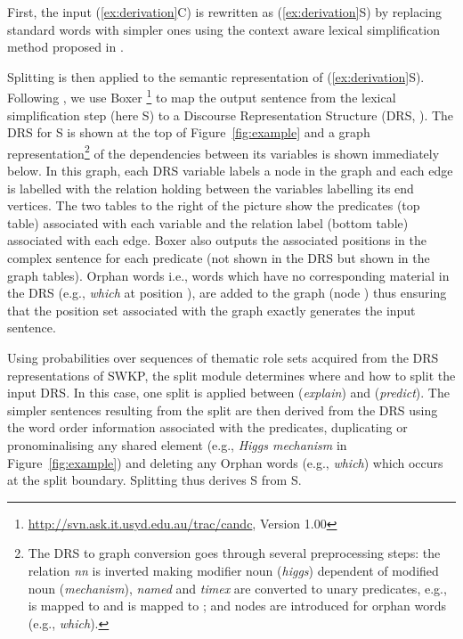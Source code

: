 \documentclass[11pt,a4paper]{article}
\newcommand{\nlang}[1]{{\it #1}}
\begin{document}
First, the input (\ref{ex:derivation}C) is rewritten as
(\ref{ex:derivation}S) by replacing standard
words with simpler ones using the context aware lexical simplification
method proposed in \cite{biran2011putting}. 

Splitting is then applied to the semantic representation of
(\ref{ex:derivation}S). Following , we
use Boxer \footnote{\url{http://svn.ask.it.usyd.edu.au/trac/candc},
  Version 1.00} \cite{curran2007linguistically} to map the output
sentence from the lexical simplification step (here S) to a
Discourse Representation Structure (DRS, \cite{kamp81}). The DRS for
S is shown at the top of Figure~\ref{fig:example} and a graph
representation\footnote{The DRS to graph conversion goes through
  several preprocessing steps: the relation \emph{nn} is inverted
  making modifier noun (\emph{higgs}) dependent of modified noun
  (\emph{mechanism}), \emph{named} and \emph{timex} are converted to
  unary predicates, e.g.,  is mapped to  and
   is mapped to ; and nodes are introduced for
  orphan words (e.g., \emph{which}).} of the dependencies between its
variables is shown immediately below.  In this graph, each DRS
variable labels a node in the graph and each edge is labelled with the
relation holding between the variables labelling its end vertices. The
two tables to the right of the picture show the predicates (top table)
associated with each variable and the relation label (bottom table)
associated with each edge. Boxer also outputs the associated positions
in the complex sentence for each predicate (not shown in the DRS but
shown in the graph tables). Orphan words i.e., words which have no
corresponding material in the DRS (e.g., \emph{which} at position
), are added to the graph (node ) thus ensuring that the
position set associated with the graph exactly generates the input
sentence.

Using probabilities over sequences of thematic role sets acquired from
the DRS representations of SWKP, the split module determines where and
how to split the input DRS. In this case, one split is applied between
 (\nlang{explain}) and  (\nlang{predict}).  The
simpler sentences resulting from the split are then derived from the
DRS using the word order information associated with the predicates,
duplicating or pronominalising any shared element (e.g., \nlang{Higgs
  mechanism} in Figure~\ref{fig:example}) and deleting any Orphan
words (e.g., \nlang{which}) which occurs at the split
boundary. Splitting thus derives S from S.
\end{document}
